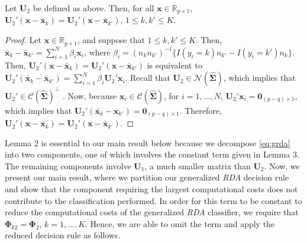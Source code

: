 \documentclass[11pt]{article}
\newcommand{\xbar}{\bar{\bm x}}
\begin{document}
\begin{lemma}\label{lemma:RDA-constant-term}
Let $\bm U_2$ be defined as above. Then, for all $\bm x \in \mathbb{R}_{p \times 1}$, $\bm U_2' (\bm x - \xbar_k) = \bm U_2' (\bm x - \xbar_{k'})$, $1 \le k, k' \le K$.
\end{lemma}
\begin{proof}
Let $\bm x \in \mathbb{R}_{p \times 1}$, and suppose that $1 \le k, k' \le K$. Then, $\xbar_k - \xbar_{k'} = \sum_{i=1}^N \beta_i \bm x_i$, where $\beta_i = (n_k n_{k'})^{-1} \{ I(y_i = k) n_{k'} - I(y_i = k') n_k \}$.  Then, $\bm U_2' (\bm x - \xbar_k) = \bm U_2' (\bm x - \xbar_{k'})$ is equivalent to $\bm U_2'(\xbar_k - \xbar_{k'}) = \sum_{i=1}^N \beta_i \bm U_2' \bm x_i$. Recall that $\bm U_2 \in \mathcal{N}(\widehat{\bm \Sigma})$, which implies that $\bm U_2' \in \mathcal{C}(\widehat{\bm \Sigma})^{\perp}$ \citep[Lemma 1.2.5]{Kollo:2005vp}. Now, because $\bm x_i \in \mathcal{C}(\widehat{\bm \Sigma})$, for $i = 1, \ldots, N$, $\bm U_2' \bm x_i = \bm 0_{(p-q) \times 1}$, which implies that $\bm U_2'(\xbar_k - \xbar_{k'}) = \bm 0_{(p-q) \times 1}$. Therefore, $\bm U_2' (\bm x - \xbar_k) = \bm U_2' (\bm x - \xbar_{k'})$.
\end{proof}

Lemma 2 is essential to our main result below because we decompose \eqref{eq:grda} into two components, one of which involves the constant term given in Lemma 3. The remaining components involve $\bm U_1$, a much smaller matrix than $\bm U_2$. Now, we present our main result, where we partition our generalized \emph{RDA} decision rule and show that the component requiring the largest computational costs does not contribute to the classification performed. In order for this term to be constant to reduce the computational costs of the generalized \emph{RDA} classifier, we require that $\bm \Phi_{k2} = \bm \Phi_2$, $k = 1, \ldots, K$. Hence, we are able to omit the term and apply the reduced decision rule as follows.
\end{document}
